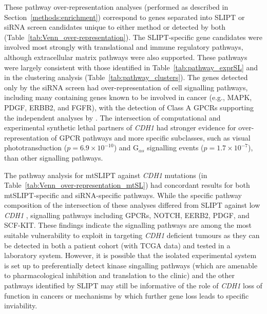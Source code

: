 These pathway over-representation analyses (performed as described in Section~\ref{methods:enrichment}) correspond to genes separated into \gls{SLIPT} or \gls{siRNA} screen candidates unique to either method or detected by both (Table~\ref{tab:Venn_over-representation}). The \gls{SLIPT}-specific gene candidates were involved most strongly with translational and immune regulatory pathways, although extracellular matrix pathways were also supported. These pathways were largely consistent with those identified in Table~\ref{tab:pathway_exprSL} and in the clustering analysis (Table~\ref{tab:pathway_clusters}). The genes detected only by the \gls{siRNA} screen had over-represent\-ation of cell signalling pathways, including many containing genes known to be involved in cancer (e.g., MAPK, PDGF, ERBB2, and FGFR), with the detection of Class A GPCRs supporting the independent analyses by \citet{Telford2015}. The intersection of computational and experimental \gls{synthetic lethal} partners of \textit{CDH1} had stronger evidence for over-represent\-ation of \gls{GPCR} pathways and more specific subclasses, such as visual phototransduction ($p=6.9 \times 10^{-10}$) and G$_{\alpha s}$ signalling events ($p=1.7 \times 10^{-7}$), than other signalling pathways.

The pathway analysis for \acrshort{mtSLIPT} against \textit{CDH1} \glspl{mutation} (in Table~\ref{tab:Venn_over-representation_mtSL}) had concordant results for both \acrshort{mtSLIPT}-specific and \gls{siRNA}-specific pathways. While the specific pathway composition of the intersection of these analyses differed from \gls{SLIPT} against low \textit{CDH1} , signalling pathways including \glspl{GPCR}, NOTCH, EERB2, PDGF, and SCF-KIT. These findings indicate the signalling pathways are among the most suitable vulnerability to exploit in targeting \textit{CDH1} deficient tumours as they can be detected in both a patient cohort (with \gls{TCGA}  data) and tested in a laboratory system. However, it is possible that the isolated experimental system is set up to preferentially detect kinase singalling pathways (which are amenable to pharmacological inhibition and translation to the clinic) and the other pathways identified by \gls{SLIPT} may still be informative of the role of \textit{CDH1} loss of function in cancers or mechanisms by which further gene loss leads to specific inviability.



